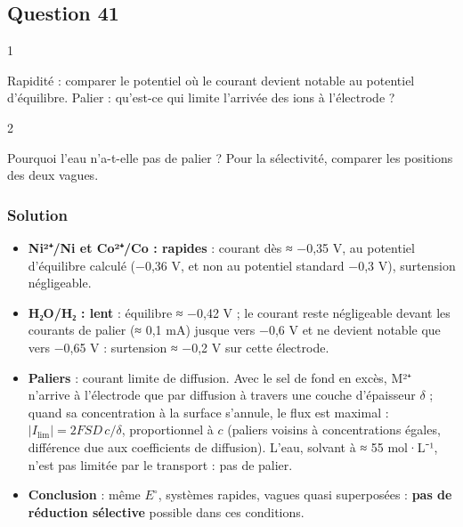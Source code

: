 \documentclass[11pt,a4paper]{article}
\providecommand{\tightlist}{\setlength{\itemsep}{0pt}\setlength{\parskip}{0pt}}
\begin{document}
\hypertarget{question-41}{%
\subsection{Question 41}\label{question-41}}

\begin{indication}{1}

Rapidité : comparer le potentiel où le courant devient notable au potentiel d'équilibre. Palier : qu'est-ce qui limite l'arrivée des ions à l'électrode ?

\end{indication}

\begin{indication}{2}

Pourquoi l'eau n'a-t-elle pas de palier ? Pour la sélectivité, comparer les positions des deux vagues.

\end{indication}

\hypertarget{solution-40}{%
\subsubsection{Solution}\label{solution-40}}

\begin{itemize}
\tightlist
\item
  \textbf{Ni²⁺/Ni et Co²⁺/Co : rapides} : courant dès ≈ −0,35 V, au potentiel d'équilibre calculé (−0,36 V, et non au potentiel standard −0,3 V), surtension négligeable.
\item
  \textbf{H₂O/H₂ : lent} : équilibre ≈ −0,42 V ; le courant reste négligeable devant les courants de palier (≈ 0,1 mA) jusque vers −0,6 V et ne devient notable que vers −0,65 V : surtension ≈ −0,2 V sur cette électrode.
\item
  \textbf{Paliers} : courant limite de diffusion. Avec le sel de fond en excès, M²⁺ n'arrive à l'électrode que par diffusion à travers une couche d'épaisseur \(\delta\) ; quand sa concentration à la surface s'annule, le flux est maximal : \(\lvert I_{\text{lim}}\rvert=2FSD\,c/\delta\), proportionnel à \(c\) (paliers voisins à concentrations égales, différence due aux coefficients de diffusion). L'eau, solvant à ≈ 55 mol·L⁻¹, n'est pas limitée par le transport : pas de palier.
\item
  \textbf{Conclusion} : même \(E^\circ\), systèmes rapides, vagues quasi superposées : \textbf{pas de réduction sélective} possible dans ces conditions.
\end{itemize}
\end{document}
